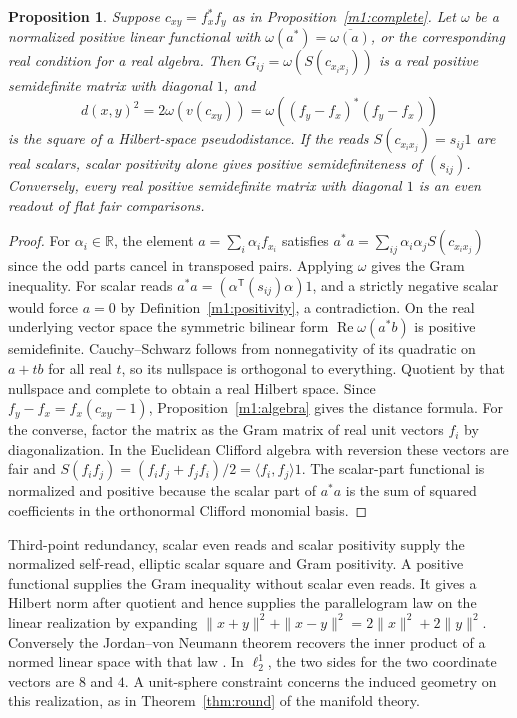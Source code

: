 \documentclass[11pt,reqno]{amsart}
\newtheorem{proposition}[theorem]{Proposition}
\theoremstyle{definition}
\theoremstyle{remark}
\numberwithin{equation}{section}
\begin{document}
\begin{proposition}\label{m1:gram}
Suppose \(c_{xy}=f_x^*f_y\) as in Proposition~\ref{m1:complete}.
Let \(\omega\) be a normalized positive linear functional with
\(\omega(a^*)=\overline{\omega(a)}\), or the corresponding real
condition for a real algebra. Then
\(G_{ij}=\omega(S(c_{x_ix_j}))\) is a real positive semidefinite
matrix with diagonal \(1\), and
\[
 d(x,y)^2=2\omega(v(c_{xy}))
          =\omega((f_y-f_x)^*(f_y-f_x))
\]
is the square of a Hilbert-space pseudodistance. If the reads
\(S(c_{x_ix_j})=s_{ij}1\) are real scalars, scalar positivity
alone gives positive semidefiniteness of \((s_{ij})\).
Conversely, every real positive semidefinite matrix with
diagonal \(1\) is an even readout of flat fair comparisons.
\end{proposition}
\begin{proof}
For \(\alpha_i\in\mathbb R\), the element \(a=\sum_i\alpha_i f_{x_i}\)
satisfies \(a^*a=\sum_{ij}\alpha_i\alpha_j S(c_{x_ix_j})\) since the
odd parts cancel in transposed pairs. Applying \(\omega\) gives
the Gram inequality. For scalar reads \(a^*a=(\alpha^{\mathsf T}
(s_{ij})\alpha)1\), and a strictly negative scalar would force
\(a=0\) by Definition~\ref{m1:positivity}, a contradiction.
On the real underlying vector space the symmetric bilinear form
\(\operatorname{Re}\omega(a^* b)\) is positive semidefinite.
Cauchy--Schwarz follows from nonnegativity of its quadratic on
\(a+tb\) for all real \(t\), so its nullspace is orthogonal to
everything. Quotient by that nullspace and complete to obtain a
real Hilbert space. Since \(f_y-f_x=f_x(c_{xy}-1)\),
Proposition~\ref{m1:algebra} gives the distance formula.
For the converse, factor the matrix as the Gram matrix of
real unit vectors \(f_i\) by diagonalization. In the Euclidean
Clifford algebra with reversion these vectors are fair and
\(S(f_i f_j)=(f_i f_j+f_j f_i)/2=\langle f_i,f_j\rangle1\).
The scalar-part functional is normalized and positive because
the scalar part of \(a^*a\) is the sum of squared coefficients
in the orthonormal Clifford monomial basis.
\end{proof}

Third-point redundancy, scalar even reads and scalar positivity
supply the normalized self-read, elliptic scalar square and Gram
positivity. A positive
functional supplies the Gram inequality without scalar even
reads. It gives a Hilbert norm after quotient and hence supplies
the parallelogram law on the linear realization by expanding
\(\|x+y\|^2+\|x-y\|^2=2\|x\|^2+2\|y\|^2\).
Conversely the Jordan--von Neumann theorem recovers the inner
product of a normed linear space with that law
\cite{m1:JordanVonNeumann}. In \(\ell^1_2\), the two sides for the
two coordinate vectors are \(8\) and \(4\).
A unit-sphere constraint concerns the induced geometry on this
realization, as in Theorem~\ref{thm:round} of the manifold theory.
\end{document}
